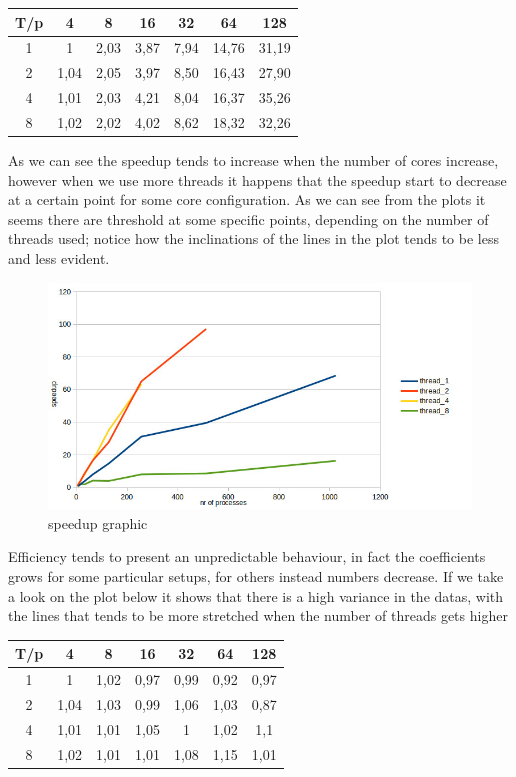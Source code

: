 \documentclass[10pt]{article}
\begin{document}
\begin{multicols}{2}
\begin{tabular}{| c | c | c | c | c | c | c |}
  \hline
  T/p & 4	 & 8	& 16	& 32	& 64 & 128  \\
  \hline
  1 & 1	& 2,03 & 3,87 & 7,94 & 14,76 & 31,19  \\
  2 & 1,04 & 2,05 & 3,97 & 8,50 & 16,43 & 27,90 \\	
  4 & 1,01 &2,03	& 4,21 &	8,04 &	16,37 &	35,26	\\	
  8 & 1,02  &2,02 &	4,02 &	8,62 &	18,32 &	32,26 \\
  \hline
\end{tabular}
\newline\newline As we can see the speedup tends to 
increase when the number of cores increase, however when
we use more threads it happens that the
speedup start to decrease at a certain point for some
core configuration. As we can see from the plots it 
seems there are threshold at some specific points, depending
on the number of threads used; notice how the inclinations
of the lines in the plot tends to be less and less evident.

\begin{figure}[H]
  \includegraphics[scale=0.3]{img/speedup.jpg}
  \centering
  \caption{speedup graphic}
\end{figure}

\noindent 
Efficiency tends to present an unpredictable behaviour,
in fact the coefficients grows for some particular setups,
for others instead numbers decrease. If we take a look on
the plot below it shows that there is a high variance in the
datas, with the lines that tends to be more stretched when the
number of threads gets higher
\newline
\newline
\begin{tabular}{| c | c | c | c | c | c | c |}
  \hline
  T/p & 4	 & 8	& 16	& 32	& 64 & 128  \\
  \hline
  1 & 1	& 1,02 & 0,97 & 0,99 & 0,92 & 0,97  \\
  2 & 1,04 & 1,03 & 0,99 & 1,06 & 1,03 & 0,87 \\	
  4 & 1,01	&1,01&	1,05&	1&	1,02&	1,1	\\	
  8 &1,02&	1,01&	1,01&	1,08&	1,15&	1,01 \\
  \hline
\end{tabular}


\end{multicols}
\end{document}
